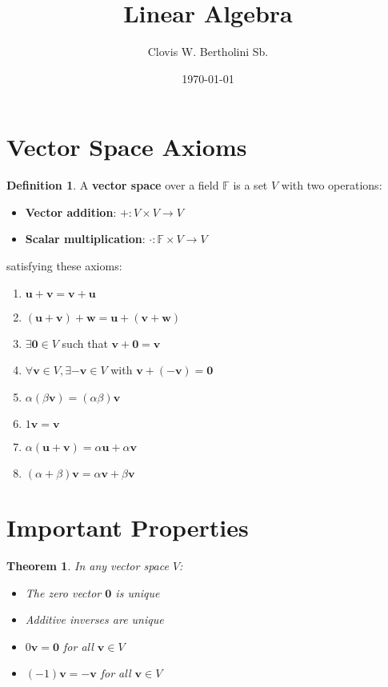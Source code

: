 \documentclass{article}
\title{Linear Algebra}
\author{Clovis W. Bertholini Sb.}
\date{\today}
\theoremstyle{plain}
\newtheorem{theorem}{Theorem}[section]
\theoremstyle{definition}
\newtheorem{definition}{Definition}[section]
\theoremstyle{remark}
\newcommand{\thmheader}[1]{%
  \textcolor{#1}{\normalfont\bfseries}%
}
\begin{document}
\maketitle

\section{Vector Space Axioms}
\begin{definition}
\thmheader{defcolor}A \textbf{vector space} over a field $\mathbb{F}$ is a set $V$ with two operations:
\begin{itemize}[leftmargin=*]
    \item \textbf{Vector addition}: $+: V \times V \to V$
    \item \textbf{Scalar multiplication}: $\cdot: \mathbb{F} \times V \to V$
\end{itemize}
satisfying these axioms:
\end{definition}

\begin{enumerate}[label=(V\arabic*),leftmargin=*]
    \item $\mathbf{u} + \mathbf{v} = \mathbf{v} + \mathbf{u}$
    \item $(\mathbf{u} + \mathbf{v}) + \mathbf{w} = \mathbf{u} + (\mathbf{v} + \mathbf{w})$
    \item $\exists \mathbf{0} \in V$ such that $\mathbf{v} + \mathbf{0} = \mathbf{v}$
    \item $\forall \mathbf{v} \in V, \exists -\mathbf{v} \in V$ with $\mathbf{v} + (-\mathbf{v}) = \mathbf{0}$
    \item $\alpha(\beta\mathbf{v}) = (\alpha\beta)\mathbf{v}$
    \item $1\mathbf{v} = \mathbf{v}$
    \item $\alpha(\mathbf{u} + \mathbf{v}) = \alpha\mathbf{u} + \alpha\mathbf{v}$
    \item $(\alpha + \beta)\mathbf{v} = \alpha\mathbf{v} + \beta\mathbf{v}$
\end{enumerate}

\section{Important Properties}
\begin{theorem}
\thmheader{theoremcolor}In any vector space $V$:
\begin{itemize}[leftmargin=*]
    \item The zero vector $\mathbf{0}$ is unique
    \item Additive inverses are unique
    \item $0\mathbf{v} = \mathbf{0}$ for all $\mathbf{v} \in V$
    \item $(-1)\mathbf{v} = -\mathbf{v}$ for all $\mathbf{v} \in V$
\end{itemize}
\end{theorem}
\end{document}
